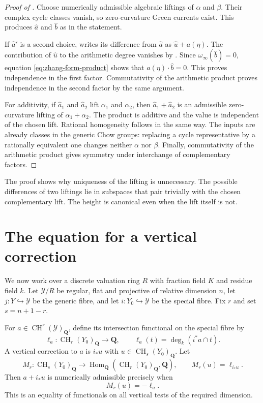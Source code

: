 \documentclass[11pt,a4paper]{article}
\theoremstyle{definition}
\numberwithin{equation}{section}
\newcommand{\CH}{\operatorname{CH}}
\newcommand{\Q}{\mathbf Q}
\newcommand{\Hom}{\operatorname{Hom}}
\begin{document}
\begin{proof}[Proof of ]
Choose numerically admissible algebraic liftings of $\alpha$ and $\beta$. Their complex cycle classes vanish, so zero-curvature Green currents exist. This produces $\widehat a$ and $\widehat b$ as in the statement.

If $\widehat a'$ is a second choice,  writes its difference from $\widehat a$ as $\widehat u+a(\eta)$. The contribution of $\widehat u$ to the arithmetic degree vanishes by . Since $\omega_\infty(\widehat b)=0$, equation \eqref{eq:zhang-form-product} shows that $a(\eta)\cdot\widehat b=0$. This proves independence in the first factor. Commutativity of the arithmetic product proves independence in the second factor by the same argument.

For additivity, if $\widehat a_1$ and $\widehat a_2$ lift $\alpha_1$ and $\alpha_2$, then $\widehat a_1+\widehat a_2$ is an admissible zero-curvature lifting of $\alpha_1+\alpha_2$. The product is additive and the value is independent of the chosen lift. Rational homogeneity follows in the same way. The inputs are already classes in the generic Chow groups: replacing a cycle representative by a rationally equivalent one changes neither $\alpha$ nor $\beta$. Finally, commutativity of the arithmetic product gives symmetry under interchange of complementary factors.
\end{proof}

The proof shows why uniqueness of the lifting is unnecessary. The possible differences of two liftings lie in subspaces that pair trivially with the chosen complementary lift. The height is canonical even when the lift itself is not.

\section{The equation for a vertical correction}\label{sec:zhang-correction}

We now work over a discrete valuation ring $R$ with fraction field $K$ and residue field $k$. Let $\mathcal Y/R$ be regular, flat and projective of relative dimension $n$, let $j:Y\hookrightarrow\mathcal Y$ be the generic fibre, and let $i:Y_0\hookrightarrow\mathcal Y$ be the special fibre. Fix $r$ and set $s=n+1-r$.

For $a\in\CH^r(\mathcal Y)_\Q$, define its intersection functional on the special fibre by
\[
 \ell_a:\CH_r(Y_0)_\Q\longrightarrow\Q,
 \qquad
 \ell_a(t)=\deg_k(i^*a\cap t).
\]
A vertical correction to $a$ is $i_*u$ with $u\in\CH_s(Y_0)_\Q$. Let
\begin{equation}\label{eq:zhang-correction-map}
 M_r:\CH_s(Y_0)_\Q\longrightarrow
       \Hom_\Q(\CH_r(Y_0)_\Q,\Q),
 \qquad
 M_r(u)=\ell_{i_*u}.
\end{equation}
Then $a+i_*u$ is numerically admissible precisely when
\begin{equation}\label{eq:zhang-correction-equation}
 M_r(u)=-\ell_a.
\end{equation}
This is an equality of functionals on all vertical tests of the required dimension.
\end{document}
